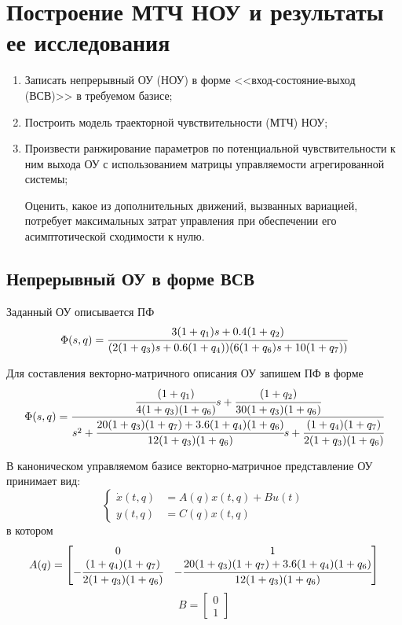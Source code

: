 \section{Построение МТЧ НОУ и результаты ее исследования}\label{problem_1}

\begin{enumerate}
	\item Записать непрерывный ОУ (НОУ) в форме <<вход-состояние-выход (ВСВ)>> в требуемом базисе;
	\item Построить модель траекторной чувствительности (МТЧ) НОУ;
	\item Произвести ранжирование параметров  по потенциальной чувствительности к ним выхода ОУ с использованием матрицы управляемости агрегированной системы; 
	
	Оценить, какое из дополнительных движений, вызванных вариацией, потребует максимальных затрат управления при обеспечении его асимптотической сходимости к нулю.
\end{enumerate}


\subsection{Непрерывный ОУ в форме ВСВ}

Заданный ОУ описывается ПФ
\begin{equation}\label{eq_OU}
\Phi (s, q) = \cfrac{3 (1 + q_1) s + 0.4 (1 + q_2)}{(2 (1+q_3)s + 0.6 (1+q_4))(6 (1 + q_6) s + 10 (1 + q_7))}
\end{equation}

Для составления векторно-матричного описания ОУ запишем ПФ в форме
\begin{equation*}\label{eq_pf_coc}
\Phi (s, q) = \cfrac{\cfrac{(1 + q_1)}{4(1+q_3)(1+q_6)} s + \cfrac{(1 + q_2)}{30(1+q_3)(1+q_6)}}{s^2 + \cfrac{20(1+q_3)(1+q_7)+3.6(1+q_4)(1+q_6)}{12(1+q_3)(1+q_6)} s + \cfrac{(1+q_4)(1+q_7)}{2(1+q_3)(1+q_6)}}
\end{equation*}

В каноническом управляемом базисе векторно-матричное представление ОУ принимает вид:
\begin{equation}\label{eq_iso_coc}
\begin{cases}
\dot x(t,q) &= A(q) x(t,q) + B u(t)\\
y(t,q) &= C(q) x(t,q)
\end{cases}
\end{equation}
в котором
\begin{equation}
	A(q) =
	\begin{bmatrix}
		0 & 1 \\
		- \cfrac{(1+q_4)(1+q_7)}{2(1+q_3)(1+q_6)} & - \cfrac{20(1+q_3)(1+q_7)+3.6(1+q_4)(1+q_6)}{12(1+q_3)(1+q_6)}
	\end{bmatrix}
\end{equation}
\begin{equation}
	B =
	\begin{bmatrix}
		0\\
		1
	\end{bmatrix}
\end{equation}

